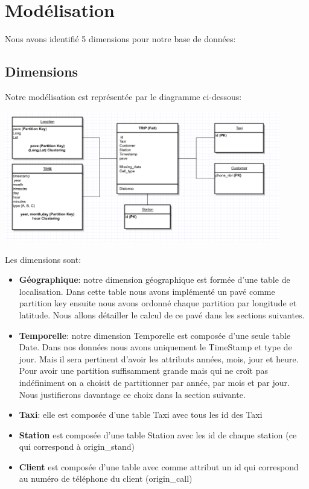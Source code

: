\documentclass[]{report}
\begin{document}
	
	\section{Modélisation}
	Nous avons identifié 5 dimensions pour notre base de données:
	\subsection{Dimensions}
	Notre modélisation est représentée par le diagramme ci-dessous:
	\begin{center}
		\includegraphics[width=120mm]{Figures/modele.png}
		\label{fig:y=6}
	\end{center}
	Les dimensions sont:
	\begin{itemize}
		\item \textbf{Géographique}: notre dimension géographique est formée d'une table de localisation. Dans cette table nous avons implémenté un pavé comme partition key ensuite nous avons ordonné chaque partition par longitude et latitude. Nous allons détailler le calcul de ce pavé dans les sections suivantes.
		\item \textbf{Temporelle}: notre dimension Temporelle est composée d'une seule table Date. Dans nos données nous avons uniquement le TimeStamp et type de jour. Mais il sera pertinent d'avoir les attributs années, mois, jour et heure. Pour avoir une partition suffisamment grande mais qui ne croît pas indéfiniment on a choisit de partitionner par année, par mois et par jour. Nous justifierons davantage ce choix dans la section suivante.
		\item \textbf{Taxi}: elle est composée d'une table Taxi avec tous les id des Taxi
		\item \textbf{Station} est composée d'une table Station avec les id de chaque station (ce qui correspond à origin\_stand)
		\item \textbf{Client}  est composée d'une table avec comme attribut un id qui correspond au numéro de téléphone du client (origin\_call)
		
	\end{itemize}
\end{document}
